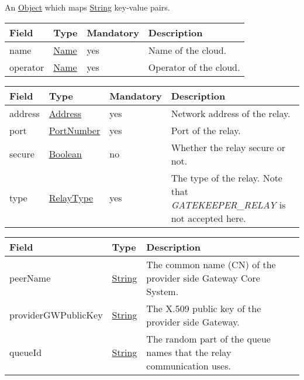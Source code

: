 \documentclass[a4paper]{arrowhead}
\newcommand{\pref}[1]{{\textcolor{ArrowheadGrey}{\hyperref[sec:model:primitives:#1]{#1}}}}
\begin{document}
\label{sec:model:Metadata}

An \pref{Object} which maps \pref{String} key-value pairs.

\clearpage

\label{sec:model:Cloud}

\begin{table}[ht!]
\begin{tabularx}{\textwidth}{| p{4cm} | p{4cm} | p{2cm} | X |} \hline
\rowcolor{gray!33} Field & Type & Mandatory & Description \\ \hline

name &\pref{Name} & yes & Name of the cloud. \\ \hline
operator &\pref{Name} & yes & Operator of the cloud. \\ \hline
\end{tabularx}
\end{table}

\label{sec:model:Relay}

\begin{table}[ht!]
\begin{tabularx}{\textwidth}{| p{4cm} | p{4cm} | p{2cm} | X |} \hline
\rowcolor{gray!33} Field & Type & Mandatory & Description \\ \hline

address &\pref{Address} & yes & Network address of the relay. \\ \hline
port &\pref{PortNumber} & yes & Port of the relay. \\ \hline
secure &\pref{Boolean} & no & Whether the relay secure or not. \\ \hline
type &\pref{RelayType} & yes & The type of the relay. Note that \textit{GATEKEEPER\_RELAY} is not accepted here. \\ \hline
\end{tabularx}
\end{table}

\label{sec:model:ConnectionResponse}
 
\begin{table}[ht!]
\begin{tabularx}{\textwidth}{| p{3.5cm} | p{5.0cm} | X |} \hline
\rowcolor{gray!33} Field & Type      & Description \\ \hline
peerName & \pref{String} & The common name (CN) of the provider side Gateway Core System. \\ \hline
providerGWPublicKey & \pref{String} & The X.509 public key of the provider side Gateway. \\ \hline
queueId & \pref{String} & The random part of the queue names that the relay communication uses. \\ \hline
\end{tabularx}
\end{table}
\end{document}

